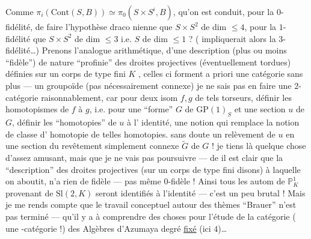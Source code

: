 Comme $\pi_i(\mathrm{Cont}(S,B))\simeq
\pi_0(S\times S^i,B)$,
 
qu'on est conduit, pour la $0$-%
fidélité, de faire l'hypothèse draco%
nienne que $S\times S^2$ de dim $\leq4$, pour la
$1$-fidélité que $S\times S^2$ de dim $\leq3$ i.e. $S$
de dim $\leq1$ ? ( impliquerait alors
la $3$-fidélité\ldots)
Prenons l'analogue arithmétique, d'une description
(plus ou moins ``fidèle'') 
de nature ``profinie''
des droites projectives  (éventuellement
tordues) définies sur un corps de type
fini $K$ ,
celles ci forment a priori une catégorie
sans plus --- un groupoïde (pas nécessairement
connexe) je ne sais pas en faire une
$2$-catégorie raisonnablement, car pour deux
isom $f,g$  de tels torseurs, définir les
homotopismes de $f$ à $g$, i.e. pour une ``forme''
$G$ de $\mathrm{GP}(1)_S$ et une section $u$ de $G$,
définir les ``homotopies'' de $u$ à l'%
identité, 
 une
notion qui remplace la notion de classe d'%
homotopie de telles homotopies.  
sans doute un relèvement de $u$ en une
section du 
revêtement simplement
connexe $\widetilde G$ de $G$ !
je tiens là quelque chose d'assez amusant,
mais que je ne vais pas poursuivre --- de
 il est clair que la ``description''
des droites projectives (sur un corps de
type fini disons) à laquelle on aboutit,
n'a rien de fidèle --- pas même $0$-fidèle !
Ainsi tous les autom de $\mathbb P^1_K$ provenant de
$\mathrm{Sl}(2,K)$ seront identifiés à l'identité ---
c'est un peu brutal ! Mais je me
rends compte que le travail conceptuel
autour des thèmes ``Brauer'' n'est pas
terminé --- qu'il y a à comprendre
des choses pour l'étude de la catégorie
( une -catégorie !)
des Algèbres d'Azumaya
 degré \uline{fixé} (ici $4$)\ldots
{}

